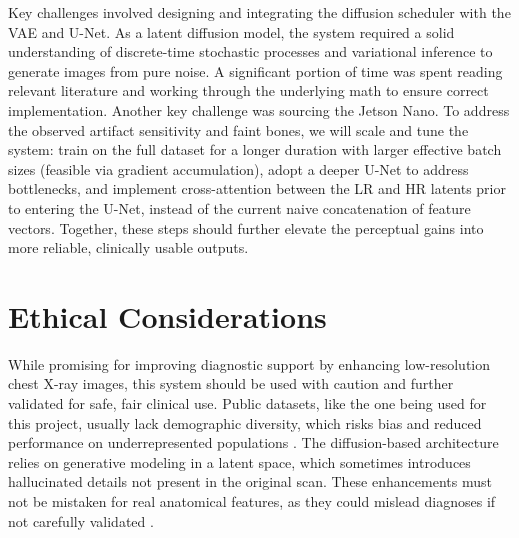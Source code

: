 \documentclass{article} %
\begin{document}
Key challenges involved designing and integrating the diffusion scheduler with the VAE and U-Net. As a latent diffusion model, the system required a solid understanding of discrete-time stochastic processes and variational inference to generate images from pure noise. A significant portion of time was spent reading relevant literature and working through the underlying math to ensure correct implementation. Another key challenge was sourcing the Jetson Nano. To address the observed artifact sensitivity and faint bones, we will scale and tune the system: train on the full dataset for a longer duration with larger effective batch sizes (feasible via gradient accumulation), adopt a deeper U-Net to address bottlenecks, and implement cross-attention between the LR and HR latents prior to entering the U-Net, instead of the current naive concatenation of feature vectors. Together, these steps should further elevate the perceptual gains into more reliable, clinically usable outputs.

\section{Ethical Considerations}

While promising for improving diagnostic support by enhancing low-resolution chest X-ray images, this system should be used with caution and further validated for safe, fair clinical use.
Public datasets, like the one being used for this project, usually lack demographic diversity, which risks bias and reduced performance on underrepresented populations \citep{Galanty2024BEAMRAD}. The diffusion-based architecture relies on generative modeling in a latent space, which sometimes introduces hallucinated details not present in the original scan. These enhancements must not be mistaken for real anatomical features, as they could mislead diagnoses if not carefully validated \citep{Shin2024SuperResolution}.

\clearpage

\label{last_page}



\end{document}
